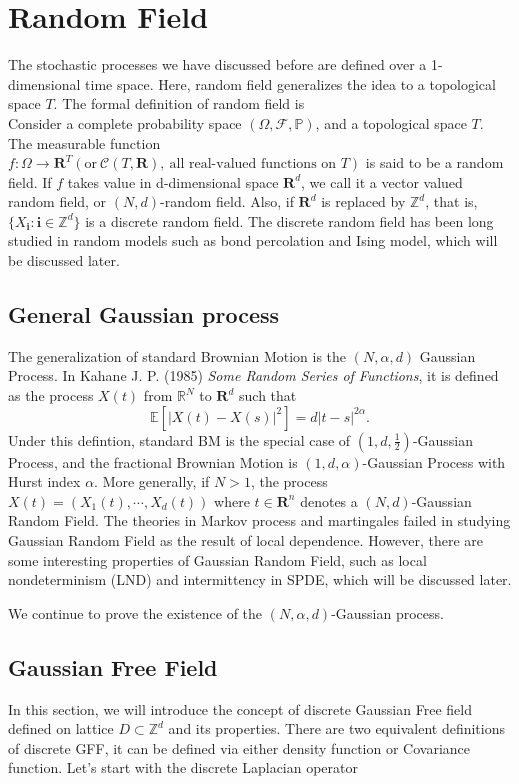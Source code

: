 \documentclass[11pt,english]{smfart}
\newcommand{\mb}{\mathbb}
\newcommand{\mf}{\mathbf}
\begin{document}
\newpage
\section{Random Field}
The stochastic processes we have discussed before are defined over a 1-dimensional time space. Here, random field generalizes the idea to a topological space $T$. The formal definition of random field is \\


    Consider a complete probability space $(\Omega, \mathcal{F},\mb{P})$, and a topological space $T$. The measurable function $f:\Omega \rightarrow \mf{R}^T (\text{or} \ \mathcal{C}(T,\mf{R}),\  \text{all real-valued functions on $T$})$ is said to be a random field. If $f$ takes value in d-dimensional space $\mf{R}^d$, we call it a vector valued random field, or $(N,d)$-random field. Also, if $\mf{R}^d$ is replaced by $\mb{Z}^d$, that is, $\{X_{\mf{i}}: \mf{i} \in \mb{Z}^d\}$ is a discrete random field. The discrete random field has been long studied in random models such as bond percolation and Ising model, which will be discussed later. 

\subsection{General Gaussian process}
The generalization of standard Brownian Motion is the $(N,\alpha,d)$ Gaussian Process. In Kahane J. P. (1985) \textit{Some Random Series of Functions}, it is defined as the process $X(t)$ from $\mathbb{R}^N$ to $\mf{R}^d$ such that $$\mb{E}\left[|X(t)-X(s)|^2\right] = d|t-s|^{2\alpha}.$$
Under this defintion, standard BM is the special case of $(1,d,\frac{1}{2})$-Gaussian Process, and the fractional Brownian Motion is $(1,d,\alpha)$-Gaussian Process with Hurst index $\alpha$. More generally, if $N > 1$, the process $X(t) = \left(X_1(t),\cdots,X_d(t)\right)$ where $t\in \mf{R}^n$ denotes a $(N,d)$-Gaussian Random Field. The theories in Markov process and martingales failed in studying Gaussian Random Field as the result of local dependence. However, there are some interesting properties of Gaussian Random Field, such as local nondeterminism (LND) and intermittency in SPDE, which will be discussed later. 

We continue to prove the existence of the $(N,\alpha,d)$-Gaussian process.

\subsection{Gaussian Free Field}
In this section, we will introduce the concept of discrete Gaussian Free field defined on lattice $D \subset \mb{Z}^d$ and its properties. There are two equivalent definitions of discrete GFF, it can be defined via either density function or Covariance function. Let's start with the discrete Laplacian operator  
\end{document}
